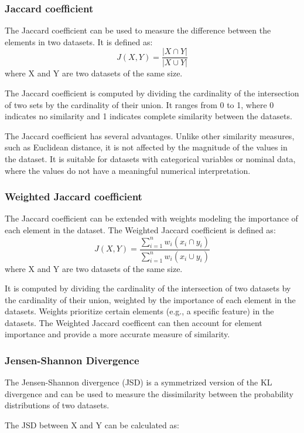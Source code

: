 \subsubsection{Jaccard coefficient}
The Jaccard coefficient can be used to measure the difference between the elements in two datasets.
It is defined as:\[J(X,Y) = \frac{|X \cap Y|}{|X \cup Y|}\]
where X and Y are two datasets of the same size.

The Jaccard coefficient is computed by dividing the cardinality of the intersection of two sets by the cardinality of their union. It ranges from 0 to 1, where 0 indicates no similarity and 1 indicates complete similarity between the datasets.

The Jaccard coefficient has several advantages. Unlike other similarity measures, such as Euclidean distance, it is not affected by the magnitude of the values in the dataset. It is suitable for datasets with categorical variables or nominal data, where the values do not have a meaningful numerical interpretation.

\subsubsection{Weighted Jaccard coefficient}
The Jaccard coefficient can be extended with weights modeling the importance of each element in the dataset.
The Weighted Jaccard coefficient is defined as:\[J(X,Y) = \frac{\sum_{i=1}^{n}w_i(x_i \cap y_i)}{\sum_{i=1}^{n}w_i(x_i \cup y_i)}\]
where X and Y are two datasets of the same size.

It is computed by dividing the cardinality of the intersection of two datasets by the cardinality of their union, weighted by the importance of each element in the datasets. Weights prioritize certain elements (e.g., a specific feature) in the datasets.
The Weighted Jaccard coefficent can then account for element importance and provide a more accurate measure of similarity.

\subsubsection{Jensen-Shannon Divergence}
The Jensen-Shannon divergence (JSD) is a symmetrized version of the KL divergence and can be used to measure the dissimilarity between the probability distributions of two datasets.

The JSD between X and Y can be calculated as:

